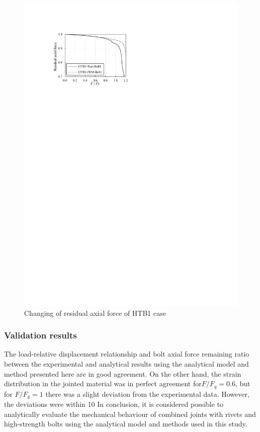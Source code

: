 \begin{figure}[htbp]
\begin{minipage}[t]{0.48\textwidth}
    \includegraphics[width=\linewidth]{imgs/ch4/figA7.pdf}
    \caption{Changing of residual axial force of HTB1 case}
    \label{ch4figA7}
    \end{minipage}
\end{figure}

\subsubsection{Validation results}

The load-relative displacement relationship and bolt axial force remaining ratio between the experimental and analytical results using the analytical model and method presented here are in good agreement. On the other hand, the strain distribution in the jointed material was in perfect agreement for$ F / F_y = 0.6$, but for $F / F_y = 1$ there was a slight deviation from the experimental data. However, the deviations were within 10%
In conclusion, it is considered possible to analytically evaluate the mechanical behaviour of combined joints with rivets and high-strength bolts using the analytical model and methods used in this study.


